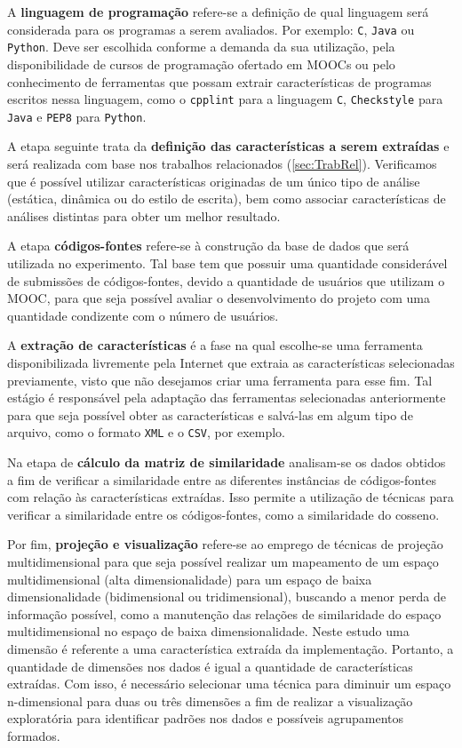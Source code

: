 	 	A \textbf{linguagem de programação} refere-se a definição de qual linguagem será
	 	considerada para os programas a serem avaliados. Por exemplo: \texttt{C}, \texttt{Java}
	 	ou \texttt{Python}. Deve ser escolhida conforme a demanda da sua utilização, pela
	 	disponibilidade de cursos de programação ofertado em \acs{MOOC}s ou pelo conhecimento
	 	de ferramentas que possam extrair características de programas escritos nessa linguagem, como o
	 	\texttt{cpplint} para a linguagem \texttt{C}, \texttt{Checkstyle} para
	 	\texttt{Java} e \texttt{PEP8} para \texttt{Python}.
	 	
	 	A etapa seguinte trata da \textbf{definição das características a serem extraídas} e será
	 	realizada com base nos trabalhos relacionados (\cref{sec:TrabRel}). Verificamos
	 	que é possível utilizar características originadas de um único tipo de análise
	 	(estática, dinâmica ou do estilo de escrita), bem como associar características
	 	de análises distintas para obter um melhor resultado.
	 	
	 	A etapa \textbf{códigos-fontes} refere-se à construção da base de dados que será
	 	utilizada no experimento. Tal base tem que possuir uma quantidade considerável de
	 	submissões de códigos-fontes, devido a quantidade de usuários que utilizam o \acs{MOOC},
	 	para que seja possível avaliar o desenvolvimento do projeto com uma quantidade
	 	condizente com o número de usuários.
	 	
	 	A \textbf{extração de características} é a fase na qual escolhe-se uma ferramenta
	 	disponibilizada livremente pela Internet que extraia as características selecionadas
	 	previamente, visto que não desejamos criar uma ferramenta para esse fim. Tal estágio
	 	é responsável pela adaptação das ferramentas selecionadas anteriormente para que seja
	 	possível obter as características e salvá-las em algum tipo de arquivo, como o
	 	formato \texttt{XML} e o \texttt{CSV}, por exemplo.
	 	
	 	Na etapa de \textbf{cálculo da matriz de similaridade} analisam-se os dados obtidos a
	 	fim de verificar a similaridade entre as diferentes instâncias de códigos-fontes com relação
	 	às características extraídas. Isso permite a utilização de técnicas para verificar a similaridade
	 	entre os códigos-fontes, como a similaridade do cosseno.
	 	
	 	Por fim, \textbf{projeção e visualização} refere-se ao emprego de técnicas de
	 	projeção multidimensional para que seja possível realizar um mapeamento de um
	 	espaço multidimensional (alta dimensionalidade) para um espaço de baixa
	 	dimensionalidade (bidimensional ou tridimensional), buscando a menor perda de
	 	informação possível, como a manutenção das relações de similaridade do espaço
	 	multidimensional no espaço de baixa dimensionalidade. Neste estudo uma dimensão
	 	é referente a uma característica extraída da implementação. Portanto, a quantidade
	 	de dimensões nos dados é igual a quantidade de características extraídas. Com isso,
	 	é necessário selecionar uma técnica para diminuir um espaço n-dimensional para
	 	duas ou três dimensões a fim de realizar a visualização exploratória para
	 	identificar padrões nos dados e possíveis agrupamentos formados.
	 	
